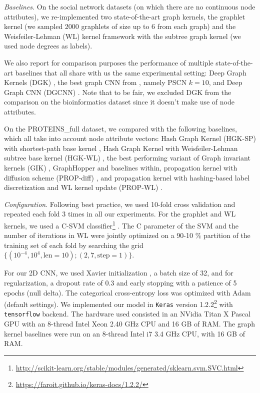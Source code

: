 \documentclass[runningheads]{llncs}
\begin{document}
\vspace{-0.8cm}

\textit{Baselines}.
On the social network datasets (on which there are no continuous node attributes), we re-implemented two state-of-the-art graph kernels, the graphlet kernel \cite{shervashidze2009efficient} (we sampled 2000 graphlets of size up to 6 from each graph) and the Weisfeiler-Lehman (WL) kernel framework \cite{shervashidze2011weisfeiler} with the subtree graph kernel \cite{gartner2003graph} (we used node degrees as labels).

We also report for comparison purposes the performance of multiple state-of-the-art baselines that all share with us the same experimental setting: Deep Graph Kernels (DGK) \cite{yanardag2015deep}, the best graph CNN from \cite{niepert2016learning}, namely PSCN $k=10$, and Deep Graph CNN (DGCNN) \cite{zhang2018end}. Note that to be fair, we excluded DGK from the comparison on the bioinformatics dataset since it doesn't make use of node attributes.

On the PROTEINS\_full dataset, we compared with the following baselines, which all take into account node attribute vectors:
Hash Graph Kernel (HGK-SP) with shortest-path base kernel \cite{morris2016faster},
Hash Graph Kernel with Weisfeiler-Lehman subtree base kernel (HGK-WL) \cite{morris2016faster},
the best performing variant of Graph invariant kernels (GIK) \cite{orsini2015graph},
GraphHopper \cite{feragen2013scalable} and baselines within,
propagation kernel with diffusion scheme (PROP-diff) \cite{neumann2012efficient}, and 
propagation kernel with hashing-based label discretization and WL kernel update (PROP-WL) \cite{neumann2012efficient}.

\textit{Configuration}.
Following best practice, we used 10-fold cross validation and repeated each fold 3 times in all our experiments. For the graphlet and WL kernels, we used a C-SVM classifier\footnote{\scriptsize{\url{http://scikit-learn.org/stable/modules/generated/sklearn.svm.SVC.html}}} \cite{scikitlearn}. The C parameter of the SVM and the number of iterations in WL were jointly optimized on a 90-10 \% partition of the training set of each fold by searching the grid $\big\{(10^{-4},10^{4},\mathrm{len}=10);(2, 7, \mathrm{step}=1)\big\}$.

For our 2D CNN, we used Xavier initialization \cite{glorot2010understanding}, a batch size of 32, and for regularization, a dropout rate of 0.3 and early stopping with a patience of 5 epochs (null delta). The categorical cross-entropy loss was optimized with Adam \cite{kingma2014adam} (default settings). We implemented our model in \texttt{Keras} \cite{chollet2015keras} version 1.2.2\footnote{\scriptsize{\url{https://faroit.github.io/keras-docs/1.2.2/}}} with \texttt{tensorflow} \cite{abadi2016tensorflow} backend. The hardware used consisted in an NVidia Titan X Pascal GPU with an 8-thread Intel Xeon 2.40 GHz CPU and 16 GB of RAM. The graph kernel baselines were run on an 8-thread Intel i7 3.4 GHz CPU, with 16 GB of RAM.
\end{document}
